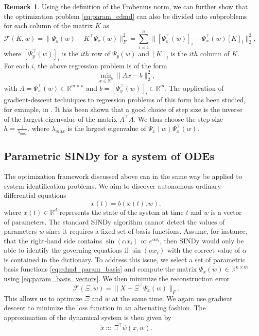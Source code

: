 \documentclass
[
    a4paper,
    DIV=11,
    abstract=true,
    11pt,
]
{scrartcl}
\newcommand{\R}{\mathbb{R}}                                      %
\theoremstyle{definition}
\newtheorem{remark}[theorem]{Remark}
\begin{document}
\begin{remark}
Using the definition of the Frobenius norm, we can further show that the optimization problem \eqref{eq:param_edmd} can also be divided into subproblems for each column of the matrix $ K $ as
\begin{equation*}
    \mathcal{F}(K, w) =\big\| \Psi_y(w) - K^{\top}\Psi_x(w) \big\|^2_F = \sum_{i=1}^n \big\| [\Psi_y^{\top}(w)]_{i} - \Psi_x^{\top}(w) [K]_{i}\big\|_2^2,
\end{equation*}
where $[\Psi_y^{\top}(w)]_{i}$ is the $ith$ row of $\Psi_y(w)$ and $[K]_i$ is the $ith$ column of $K$. For each $i$, the above regression problem is of the form
\begin{equation*}
    \min_{x \in \R^n} \big\|Ax - b\big\|_2^2,
\end{equation*}
with $A = \Psi_x^{\top}(w) \in \mathbb{R}^{m \times n}$ and $b = [\Psi_y^{\top}(w)]_{i} \in \mathbb{R}^m$. The application of gradient-descent techniques to regression problems of this form has been studied, for example, in \cite{nesterov2018lectures}. It has been shown that a good choice of step size is the inverse of the largest eigenvalue of the matrix $A^{\top} A$. We thus choose the step size $h = \frac{1}{\lambda_{max}}$, where $\lambda_{max}$ is the largest eigenvalue of $\Psi_x(w) \Psi_x^{\top}(w)$.
\end{remark}

\subsection{Parametric SINDy for a system of ODEs}

The optimization framework discussed above can in the same way be applied to system identification problems. We aim to discover autonomous ordinary differential equations
\begin{equation*}
    \dot{x}(t) = b(x(t), w),
\end{equation*}
where $x(t) \in \R^d$ represents the state of the system at time $t$ and $w$ is a vector of parameters. The standard SINDy algorithm cannot detect the values of parameters $w$ since it requires a fixed set of basis functions. Assume, for instance, that the right-hand side contains $ \sin(\alpha x_i) $ or $ e^{\alpha x_i} $, then SINDy would only be able to identify the governing equations if $ \sin(\alpha x_i) $ with the correct value of $\alpha$ is contained in the dictionary. To address this issue, we select a set of parametric basis functions \eqref{eq:edmd_param_basis} and compute the matrix $\Psi_x(w) \in \mathbb{R}^{n \times m}$ using \eqref{eq:param_basis_vectors}. We then minimize the reconstruction error
\begin{equation} \label{eq:param_sindy}
    \mathcal{F}(\Xi, w) = \big\|\dot{X} - \Xi^{\top}\Psi_x(w)\big\|_F.
\end{equation}
This allows us to optimize $\Xi$ and $w$ at the same time. We again use gradient descent to minimize the loss function in an alternating fashion. The approximation of the dynamical system is then given by
\begin{align*}
    \dot{x} \approx \Xi^{\top} \psi(x, w).
\end{align*}
\end{document}
